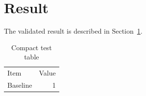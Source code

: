 \documentclass{article}
\begin{document}
\section{Result}\label{sec:result}
The validated result is described in Section~\ref{sec:result}.
\begin{table}[h]
\centering
\caption{Compact test table}
\begin{tabular}{lr}
Item & Value \\
Baseline & 1 \\
\end{tabular}
\end{table}
\end{document}
